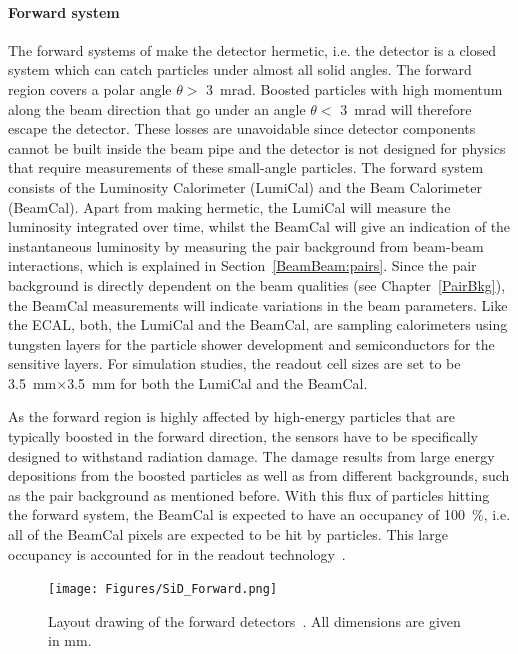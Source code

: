 \paragraph{Forward system}
The forward systems of \sid make the detector hermetic, i.e. the detector is a closed system which can catch particles under almost all solid angles.
The forward region covers a polar angle $\theta > $ \SI{3}{\milli\radian}.
Boosted particles with high momentum along the beam direction that go under an angle $\theta < $ \SI{3}{\milli\radian} will therefore escape the detector.
These losses are unavoidable since detector components cannot be built inside the beam pipe and the detector is not designed for physics that require measurements of these small-angle particles.
The forward system consists of the Luminosity Calorimeter (LumiCal) and the Beam Calorimeter (BeamCal).
Apart from making \sid hermetic, the LumiCal will measure the luminosity integrated over time, whilst the BeamCal will give an indication of the instantaneous luminosity by measuring the \positron \electron pair background from beam-beam interactions, which is explained in Section~\ref{BeamBeam:pairs}.
Since the pair background is directly dependent on the beam qualities (see Chapter~\ref{PairBkg}), the BeamCal measurements will indicate variations in the beam parameters.
Like the ECAL, both, the LumiCal and the BeamCal, are sampling calorimeters using tungsten layers for the particle shower development and semiconductors for the sensitive layers.
For simulation studies, the readout cell sizes are set to be \SI{3.5}{\milli\meter}$\times$\SI{3.5}{\milli\meter} for both the LumiCal and the BeamCal.

As the forward region is highly affected by high-energy particles that are typically boosted in the forward direction, the sensors have to be specifically designed to withstand radiation damage.
The damage results from large energy depositions from the boosted particles as well as from different backgrounds, such as the pair background as mentioned before.
With this flux of particles hitting the forward system, the BeamCal is expected to have an occupancy of \SI{100}{\percent}, i.e. all of the BeamCal pixels are expected to be hit by particles.
This large occupancy is accounted for in the readout technology~\cite[p. 133ff]{TDR4}.
\begin{figure}[h!]
\centering
\texttt{[image: Figures/SiD\_Forward.png]}
\caption[Drawing of the \sid forward detectors]{Layout drawing of the \sid forward detectors~\cite[p. 134]{TDR4}.
All dimensions are given in mm.}
\label{fig:SiD_Forward}
\end{figure}

